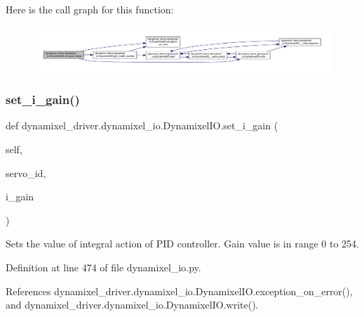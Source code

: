 Here is the call graph for this function\+:
\nopagebreak
\begin{figure}[H]
\begin{center}
\leavevmode
\includegraphics[width=350pt]{dd/d77/classdynamixel__driver_1_1dynamixel__io_1_1_dynamixel_i_o_a5d9728d7f0159ccd73fa6de0b1bfb402_cgraph}
\end{center}
\end{figure}
\mbox{\label{classdynamixel__driver_1_1dynamixel__io_1_1_dynamixel_i_o_a3d65dc76f96e3c11e2319a1dd79e85dd}} 
\subsubsection{\texorpdfstring{set\+\_\+i\+\_\+gain()}{set\_i\_gain()}}
{\footnotesize\ttfamily def dynamixel\+\_\+driver.\+dynamixel\+\_\+io.\+Dynamixel\+I\+O.\+set\+\_\+i\+\_\+gain (\begin{DoxyParamCaption}\item[{}]{self,  }\item[{}]{servo\+\_\+id,  }\item[{}]{i\+\_\+gain }\end{DoxyParamCaption})}

\begin{DoxyVerb}Sets the value of integral action of PID controller.
Gain value is in range 0 to 254.
\end{DoxyVerb}
 

Definition at line 474 of file dynamixel\+\_\+io.\+py.



References dynamixel\+\_\+driver.\+dynamixel\+\_\+io.\+Dynamixel\+I\+O.\+exception\+\_\+on\+\_\+error(), and dynamixel\+\_\+driver.\+dynamixel\+\_\+io.\+Dynamixel\+I\+O.\+write().


